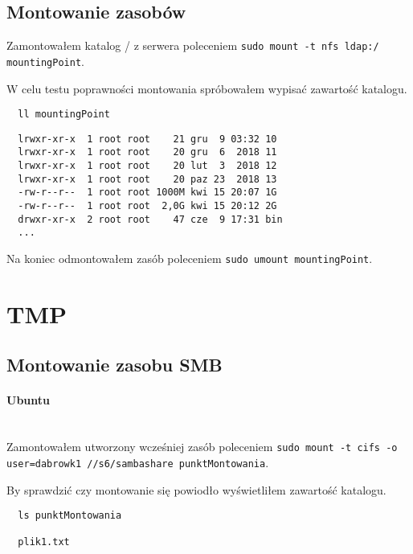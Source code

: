 \documentclass{article} %
\begin{document}
\subsection{Montowanie zasobów}
Zamontowałem katalog / z serwera poleceniem \texttt{sudo mount -t nfs ldap:/ mountingPoint}.

W celu testu poprawności montowania spróbowałem wypisać zawartość katalogu.
\begin{tcolorbox}[colback=yellow!10!white,colframe=red!45!black,coltitle=yellow!100!black, title=Ubuntu]
  \begin{lstlisting}
  ll mountingPoint
  \end{lstlisting}
  \tcblower
  \footnotesize
  \begin{lstlisting}
  lrwxr-xr-x  1 root root    21 gru  9 03:32 10
  lrwxr-xr-x  1 root root    20 gru  6  2018 11
  lrwxr-xr-x  1 root root    20 lut  3  2018 12
  lrwxr-xr-x  1 root root    20 paz 23  2018 13
  -rw-r--r--  1 root root 1000M kwi 15 20:07 1G 
  -rw-r--r--  1 root root  2,0G kwi 15 20:12 2G
  drwxr-xr-x  2 root root    47 cze  9 17:31 bin
  ...
  \end{lstlisting}
\end{tcolorbox}
\normalsize
\vspace{5mm}

Na koniec odmontowałem zasób poleceniem \texttt{sudo umount mountingPoint}.

\section{TMP}

\subsection{Montowanie zasobu SMB}
\paragraph{Ubuntu} \mbox{} \\
Zamontowałem utworzony wcześniej zasób poleceniem \texttt{sudo mount -t cifs -o user=dabrowk1 //s6/sambashare punktMontowania}.

By sprawdzić czy montowanie się powiodło wyświetliłem zawartość katalogu.
\begin{verbatim}
  ls punktMontowania 

  plik1.txt
\end{verbatim}
\end{document}

